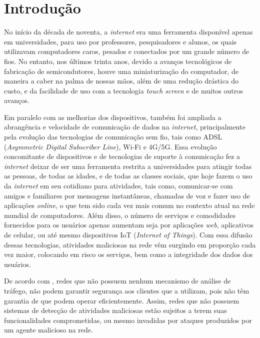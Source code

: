 \chapter[Introdução]{Introdução}
\label{introducao}
No início da década de noventa, a \textit{internet} era uma ferramenta disponível apenas em universidades, para uso por professores, pesquisadores e alunos, os quais utilizavam computadores caros, pesados e conectados por um grande número de fios. No entanto, nos últimos trinta anos, devido a avanços tecnológicos de fabricação de semicondutores, houve uma miniaturização do computador, de maneira a caber na palma de nossas mãos, além de uma redução drástica do custo, e da facilidade de uso com a tecnologia \textit{touch screen} e de muitos outros avanços. 

Em paralelo com as melhorias dos dispositivos, também foi ampliada a abrangência e velocidade de comunicação de dados na \textit{internet}, principalmente pela evolução das tecnologias de comunicação sem fio, tais como ADSL (\textit{Asymmetric Digital Subscriber Line}), Wi-Fi e 4G/5G. Essa evolução concomitante de dispositivos e de tecnologias de suporte à comunicação fez a \textit{internet} deixar de ser uma ferramenta restrita a universidades para atingir todas as pessoas, de todas as idades, e de todas as classes sociais, que hoje fazem o uso da \textit{internet} em seu cotidiano para atividades, tais como, comunicar-se com amigos e familiares por mensagens instantâneas, chamadas de voz e fazer uso de aplicações \textit{online}, o que tem sido cada vez mais comum no contexto atual na rede mundial de computadores. Além disso, o número de serviços e comodidades fornecidos para os usuários apenas aumentam seja por aplicações \textit{web}, aplicativos de celular, ou até mesmo dispositivos IoT (\textit{Internet of Things}). Com essa difusão dessas tecnologias, atividades maliciosas na rede vêm surgindo em proporção cada vez maior, colocando em risco os serviços, bem como a integridade dos dados dos usuários. 

De acordo com , redes que não possuem nenhum mecanismo de análise de tráfego, não podem garantir segurança aos clientes que a utilizam, pois não têm garantia de que podem operar eficientemente. Assim, redes que não possuem sistemas de detecção de atividades maliciosas estão sujeitos a terem suas funcionalidades comprometidas, ou mesmo invadidas por ataques produzidos por um agente malicioso na rede.

